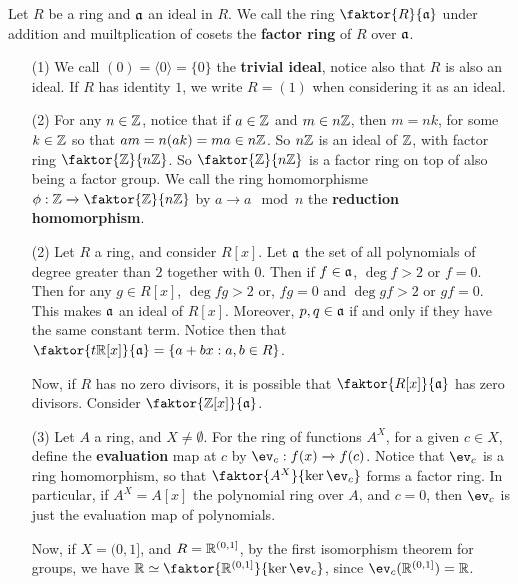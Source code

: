\begin{definition}
  Let $R$ be a ring and $\mathfrak{a}$ an ideal in $R$. We call the ring
  $\faktor{R}{\af}$
  under addition and muiltplication of cosets the \textbf{factor ring}
  of $R$ over  $\mathfrak{a}$.
\end{definition}

\begin{example}\label{example_5.10}
  \begin{enumerate}
    \item[(1)] We call $(0)=\langle 0 \rangle=\{0\}$ the \textbf{trivial ideal},
      notice also that $R$ is also an ideal. If $R$ has identity $1$,
      we write $R=(1)$ when considering it as an ideal.

    \item[(2)] For any $n \in \mathbb{Z}$, notice that if $a \in \mathbb{Z}$ and $m \in
      n\mathbb{Z}$, then  $m=nk$, for some  $k \in \mathbb{Z}$ so that  $am=n(ak)=ma \in
      n\mathbb{Z}$. So $n\mathbb{Z}$ is an ideal of $\mathbb{Z}$, with factor ring
      $\faktor{\Z}{n\Z}$. So $\faktor{\Z}{n\Z}$ is a factor ring on top of
      also being a factor group. We call the ring homomorphisme $\phi:\Z
      \xrightarrow{} \faktor{\Z}{n\Z}$ by $a \xrightarrow{} a \mod{n}$ the
      \textbf{reduction homomorphism}.

    \item[(2)] Let $R$ a ring, and consider  $R[x]$. Let $\mathfrak{a}$ the set of all
      polynomials of degree greater than $2$ together with $0$. Then if
      $f \in \mathfrak{a}$,  $\deg{f}>2$ or $f=0$. Then for any  $g \in R[x]$,
      $\deg{fg}>2$ or, $fg=0$ and $\deg{gf}>2$ or $gf=0$. This
      makes  $\mathfrak{a}$ an ideal of $R[x]$. Moreover, $p,q \in \mathfrak{a}$ if and
      only if they have the same constant term. Notice then that
      $\faktor{t\R[x]}{\af}=\{a+bx : a,b \in R\}$.

      Now, if $R$ has no zero divisors, it is possible that
      $\faktor{R[x]}{\af}$ has zero divisors. Consider
      $\faktor{\Z[x]}{\af}$.

    \item[(3)] Let $A$ a ring, and  $X \neq \emptyset$. For the ring of
      functions $A^X$, for a given $c \in X$, define the
      \textbf{evaluation} map at $c$ by $\ev_c:f(x) \xrightarrow{} f(c)$.
      Notice that $\ev_c$ is a ring homomorphism, so that
      $\faktor{A^X}{\ker{\ev_c}}$ forms a factor ring. In particular, if
      $A^X=A[x]$ the polynomial ring over $A$, and  $c=0$, then $\ev_c$ is
      just the evaluation map of polynomials.

      Now, if  $X=(0,1]$, and $R=\mathbb{R}^{(0,1]}$, by the first isomorphism
      theorem for groups, we have $\R \simeq \faktor{\R^{(0,1]}}{\ker{\ev_c}}$,
      since $\ev_c(\R^{(0,1]})=\R$.


\end{enumerate}
\end{example}
